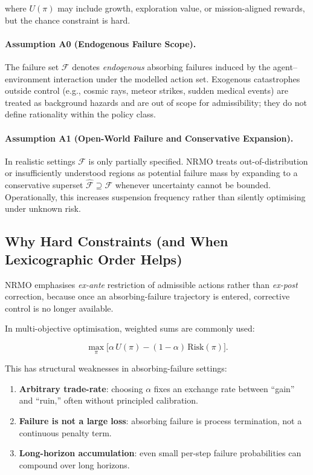 where $U(\pi)$ may include growth, exploration value, or
mission-aligned rewards, but the chance constraint is hard.

\paragraph{Assumption A0 (Endogenous Failure Scope).}
The failure set $\mathcal{F}$ denotes \emph{endogenous} absorbing
failures induced by the agent--environment interaction under the
modelled action set. Exogenous catastrophes outside control (e.g.,
cosmic rays, meteor strikes, sudden medical events) are treated as
background hazards and are out of scope for admissibility; they do
not define rationality within the policy class.

\paragraph{Assumption A1 (Open-World Failure and Conservative
Expansion).}
In realistic settings $\mathcal{F}$ is only partially specified.
NRMO treats out-of-distribution or insufficiently understood regions
as potential failure mass by expanding to a conservative superset
$\widehat{\mathcal{F}} \supseteq \mathcal{F}$ whenever uncertainty
cannot be bounded. Operationally, this increases suspension
frequency rather than silently optimising under unknown risk.

\subsection{Why Hard Constraints (and When Lexicographic Order Helps)}
\label{sec:foundations-3-2-hard-constraints}

NRMO emphasises \emph{ex-ante} restriction of admissible actions
rather than \emph{ex-post} correction, because once an
absorbing-failure trajectory is entered, corrective control is no
longer available.

In multi-objective optimisation, weighted sums are commonly used:

\begin{equation}
\max_\pi \bigl[\alpha \, U(\pi) - (1 - \alpha) \, \mathrm{Risk}(\pi)\bigr].
\end{equation}

This has structural weaknesses in absorbing-failure settings:

\begin{enumerate}
\item \textbf{Arbitrary trade-rate}: choosing $\alpha$ fixes an
exchange rate between ``gain'' and ``ruin,'' often without
principled calibration.
\item \textbf{Failure is not a large loss}: absorbing failure is
process termination, not a continuous penalty term.
\item \textbf{Long-horizon accumulation}: even small per-step
failure probabilities can compound over long horizons.
\end{enumerate}

